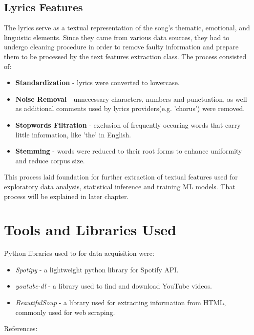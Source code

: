 \subsection{Lyrics Features}
 The lyrics serve as a textual representation of the song's thematic,
 emotional, and linguistic elements. Since they came from various data sources,
 they had  to undergo cleaning procedure in order to remove faulty information
 and prepare them to be processed by the text features extraction class. The
 process consisted of:
 \begin{itemize}
  \item \textbf{Standardization} - lyrics were converted to lowercase.
  \item \textbf{Noise Removal} - unnecessary characters, numbers and
    punctuation, as well as additional comments used by lyrics providers(e.g.
    'chorus') were removed.
  \item \textbf{Stopwords Filtration} - exclusion of frequently occuring words
    that carry little information, like 'the' in English.
  \item \textbf{Stemming} - words were reduced to their root forms to enhance
    uniformity and reduce corpus size.
 \end{itemize}

 This process laid foundation for further extraction of textual features used
 for exploratory data analysis, statistical inference and training ML models.
 That process will be explained in later chapter.



\section{Tools and Libraries Used}
\label{sec:toolsandlibrariesused}
Python libraries used to for data acquisition were:
\begin{itemize}
  \item \textit{Spotipy} - a lightweight python library for
    Spotify API.
  \item \textit{youtube-dl}  - a library used to find and download
    YouTube videos.
  \item \textit{BeautifulSoup}  - a library used for
    extracting information from HTML, commonly used for web scraping.
\end{itemize}

References: \cite{spotipy} \cite{ytdl} \cite{beautifulsoup}

